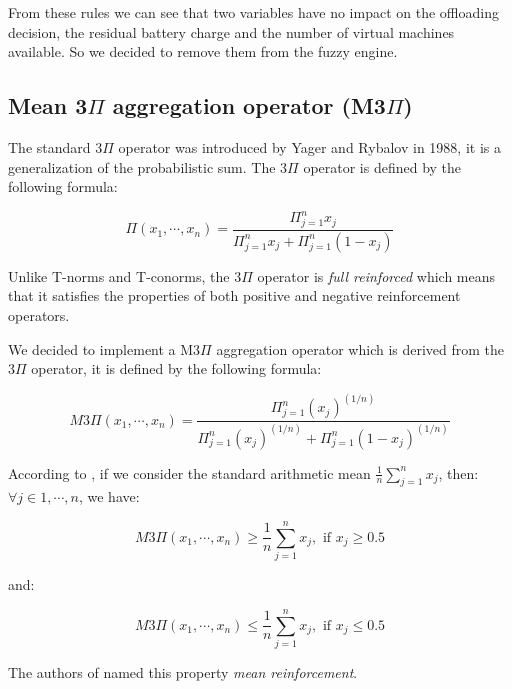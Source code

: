 From these rules we can see that two variables have no impact on the offloading decision, the residual battery charge
and the number of virtual machines available. So we decided to remove them from the fuzzy engine.

\subsection{Mean 3\texorpdfstring{$\Pi$}{Pi} aggregation operator (M3\texorpdfstring{$\Pi$}{Pi})}

The standard 3$\Pi$ operator was introduced by Yager and Rybalov \cite{yager-rybalov-1998} in 1988, it is a
generalization of the probabilistic sum. The 3$\Pi$ operator is defined by the following formula:

\begin{equation}
  \Pi(x_1, \cdots, x_n) = \frac{\Pi_{j=1}^n x_j}{\Pi_{j=1}^n x_j + \Pi_{j=1}^n (1 - x_j)}
\end{equation}

Unlike T-norms and T-conorms, the 3$\Pi$ operator is \textit{full reinforced} which means that it satisfies the
properties of both positive and negative reinforcement operators.

We decided to implement a M3$\Pi$ aggregation operator which is derived from the 3$\Pi$ operator, it is defined
by the following formula:

\begin{equation}
  M3\Pi(x_1, \cdots, x_n) = \frac{\Pi_{j=1}^n (x_j)^{(1/n)}}{\Pi_{j=1}^n (x_j)^{(1/n)} + \Pi_{j=1}^n (1 - x_j)^{(1/n)}}
\end{equation}

According to \cite{doncescu-et-al-2007}, if we consider the standard arithmetic mean $\frac{1}{n}\sum_{j=1}^{n}x_j$, then: \\
$\forall j \in 1, \cdots, n$, we have:

\begin{equation}
  M3\Pi(x_1, \cdots, x_n) \geq \frac{1}{n}\sum_{j=1}^{n}x_j, \text{ if } x_j \geq 0.5
\end{equation}

and:

\begin{equation}
  M3\Pi(x_1, \cdots, x_n) \leq \frac{1}{n}\sum_{j=1}^{n}x_j, \text{ if } x_j \leq 0.5
\end{equation}

The authors of \cite{doncescu-et-al-2007} named this property \textit{mean reinforcement}.

